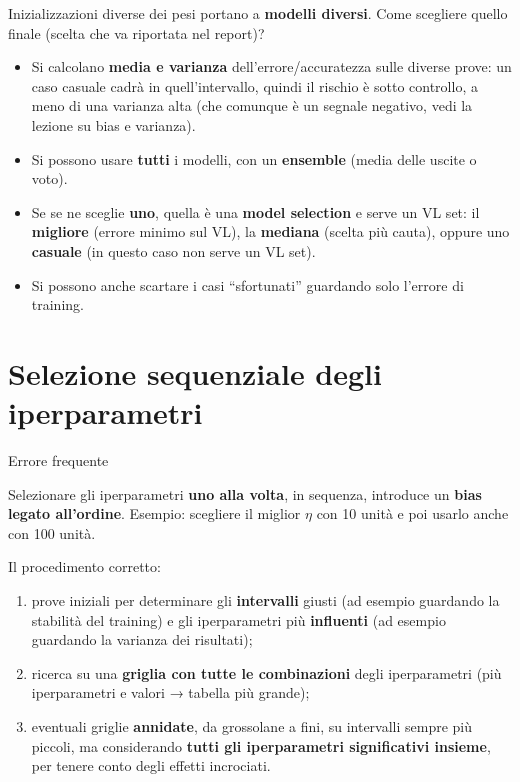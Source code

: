 Inizializzazioni diverse dei pesi portano a \textbf{modelli diversi}.
Come scegliere quello finale (scelta che va riportata nel report)?

\begin{itemize}
\tightlist
\item
  Si calcolano \textbf{media e varianza} dell'errore/accuratezza sulle
  diverse prove: un caso casuale cadrà in quell'intervallo, quindi il
  rischio è sotto controllo, a meno di una varianza alta (che comunque è
  un segnale negativo, vedi la lezione su bias e varianza).
\item
  Si possono usare \textbf{tutti} i modelli, con un \textbf{ensemble}
  (media delle uscite o voto).
\item
  Se se ne sceglie \textbf{uno}, quella è una \textbf{model selection} e
  serve un VL set: il \textbf{migliore} (errore minimo sul VL), la
  \textbf{mediana} (scelta più cauta), oppure uno \textbf{casuale} (in
  questo caso non serve un VL set).
\item
  Si possono anche scartare i casi ``sfortunati'' guardando solo
  l'errore di training.
\end{itemize}

\section{Selezione sequenziale degli
iperparametri}\label{selezione-sequenziale-degli-iperparametri}

\begin{boxwarning}{Errore frequente}

Selezionare gli iperparametri \textbf{uno alla volta}, in sequenza,
introduce un \textbf{bias legato all'ordine}. Esempio: scegliere il
miglior \(\eta\) con 10 unità e poi usarlo anche con 100 unità.

\end{boxwarning}

Il procedimento corretto:

\begin{enumerate}
\def\labelenumi{\arabic{enumi}.}
\tightlist
\item
  prove iniziali per determinare gli \textbf{intervalli} giusti (ad
  esempio guardando la stabilità del training) e gli iperparametri più
  \textbf{influenti} (ad esempio guardando la varianza dei risultati);
\item
  ricerca su una \textbf{griglia con tutte le combinazioni} degli
  iperparametri (più iperparametri e valori → tabella più grande);
\item
  eventuali griglie \textbf{annidate}, da grossolane a fini, su
  intervalli sempre più piccoli, ma considerando \textbf{tutti gli
  iperparametri significativi insieme}, per tenere conto degli effetti
  incrociati.
\end{enumerate}

